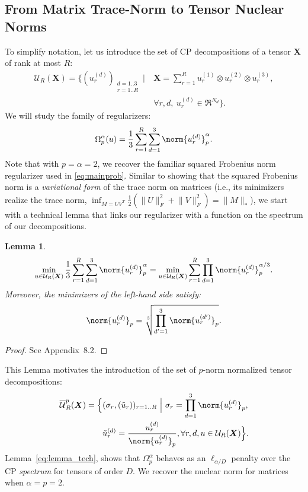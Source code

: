 \documentclass{article}
\newtheorem{lemma}{Lemma}
\newcommand{\tensor}[1]{{\bm #1}}
\newcommand{\CP}{{CP}\xspace}
\newcommand{\tens}[1]{\tensor{#1}}
\newcommand{\rkv}{r}
\newcommand{\rk}{R}
\newcommand{\dv}{d}
\newcommand{\unkn}{X}
\newcommand{\facv}[2]{u^{(#1)}_{#2}}
\newcommand{\allfaccp}{\mathcal{U}_R(\tens{\unkn})}
\newcommand{\nallfaccp}[1]{\overline{\mathcal{U}}^{#1}_R(\tens{\unkn})}
\begin{document}
\subsection{From Matrix Trace-Norm to Tensor Nuclear Norms}
To simplify notation, let us introduce the set of \CP decompositions of a tensor $\tens{\unkn}$ of rank at most $R$:
\begin{align}
\allfaccp=\Big \{(\facv{\dv}{\rkv})_{\substack{\dv=1..3\\\rkv=1..\rk}}~\Big|~ &\tens{\unkn} = \sum_{\rkv=1}^\rk \!\facv{1}{\rkv} \otimes \facv{2}{\rkv}\otimes\facv{3}{\rkv},\\
&\forall r, d, \: \facv{\dv}{\rkv} \in\Re^{N_d}\Big \}.
\end{align}
We will study the family of regularizers:
\begin{equation}
\label{eq:omegas}
\Omega^{\alpha}_p(u) = \frac{1}{3}\sum_{r=1}^R\sum_{d=1}^3\norm{u_r^{(d)}}_p^{\alpha}.
\end{equation}
Note that with $p=\alpha=2$, we recover the familiar squared Frobenius norm regularizer used in \eqref{eq:mainprob}. Similar to showing that the squared Frobenius norm is a \emph{variational form} of the trace norm on matrices (i.e., its minimizers realize the trace norm, $\inf_{M=UV^T}\frac{1}{2}(\lVert U\lVert_F^2+\lVert V\lVert_F^2) = \lVert M\lVert_*$), we start with a technical lemma that links our regularizer with a function on the spectrum of our decompositions. 
\begin{lemma}
\begin{equation}
\label{eq:lemma_tech}
\min_{u\in \allfaccp}\frac{1}{3}\sum_{r=1}^R\sum_{d=1}^3\norm{u_r^{(d)}}_p^{\alpha} = \min_{u \in \allfaccp}\sum_{r=1}^R\prod_{d=1}^3\norm{u_r^{(d)}}_p^{\alpha/3}.
\end{equation}
Moreover, the minimizers of the left-hand side satisfy: 
\begin{equation}
\norm{u_r^{(d)}}_p = \sqrt[3]{\prod_{d'=1}^3\norm{u_r^{(d')}}_p}.
\end{equation}
\end{lemma}
\begin{proof}
See Appendix~8.2.
\end{proof}
This Lemma motivates the introduction of the set of $p$-norm normalized tensor decompositions:
\begin{align}
\nallfaccp{p}=\Big \{&(\sigma_{\rkv}, (\tilde{u}_r))_{r=1..R}~\Big|~ \sigma_{\rkv} = \prod_{d=1}^3\norm{u^{(d)}_{\rkv}}_p,\nonumber \\
&\tilde{u}^{(d)}_r = \frac{u^{(d)}_r}{\norm{u^{(d)}_r}_p}, \forall r,d, u \in\allfaccp \Big \}.
\end{align}
Lemma~\ref{eq:lemma_tech}, shows that $\Omega_p^\alpha$ behaves as an $\ell_{\alpha/D}$ penalty over the CP \emph{spectrum} for tensors of order $D$. We recover the nuclear norm for matrices when $\alpha = p = 2$.
\end{document}

